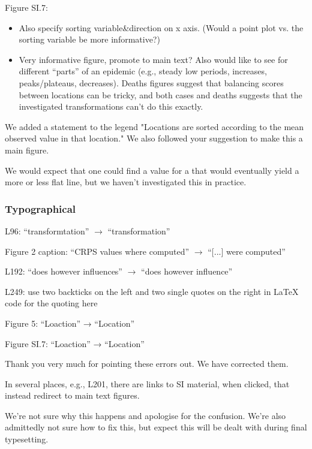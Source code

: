 \documentclass{article}
\newcommand{\black}{\color{black}}
\newcommand{\blue}{\color{blue}}
\newcommand{\notindented}{\setlength{\leftskip}{0cm}}
\begin{document}
\notindented

\blue
Figure SI.7:
\begin{itemize}
    \item Also specify sorting variable\&direction on x axis. (Would a point plot vs. the sorting variable be more informative?)
    \item Very informative figure, promote to main text? Also would like to see for different “parts” of an epidemic (e.g., steady low periods, increases, peaks/plateaus, decreases). Deaths figures suggest that balancing scores between locations can be tricky, and both cases and deaths suggests that the investigated transformations can’t do this exactly.
\end{itemize}

\black
We added a statement to the legend "Locations are sorted according to the mean observed value in that location." We also followed your suggestion to make this a main figure. 

We would expect that one could find a value for a that would eventually yield a more or less flat line, but we haven't investigated this in practice. 

\blue
\subsubsection{Typographical}
\blue
L96: “transformtation” $\xrightarrow{}$ “transformation”

Figure 2 caption: “CRPS values where computed” $\xrightarrow{}$ “[...] were computed”

L192: “does however influences” $\xrightarrow{}$ “does however influence”

L249: use two backticks on the left and two single quotes on the right in LaTeX code for the quoting here

Figure 5: “Loaction” → “Location”

Figure SI.7: “Loaction” → “Location”

\black
Thank you very much for pointing these errors out. We have corrected them. 


\blue
In several places, e.g., L201, there are links to SI material, when clicked, that instead redirect to main text figures.

\black
We're not sure why this happens and apologise for the confusion. We're also admittedly not sure how to fix this, but expect this will be dealt with during final typesetting. 
\end{document}
